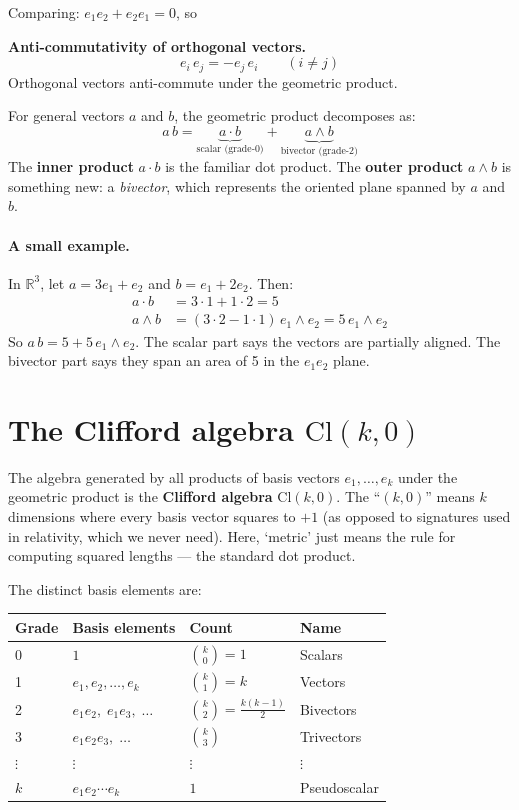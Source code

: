 \documentclass[11pt, twoside, openright]{memoir}
\newcommand{\ip}{\cdot}           %
\newcommand{\op}{\wedge}          %
\begin{document}
Comparing: $e_1 e_2 + e_2 e_1 = 0$, so

\begin{gabox}
\textbf{Anti-commutativity of orthogonal vectors.}
\[
  e_i \, e_j = -e_j \, e_i \qquad (i \neq j)
\]
Orthogonal vectors anti-commute under the geometric product.
\end{gabox}

For general vectors $a$ and $b$, the geometric product decomposes as:
\[
  a \, b = \underbrace{a \ip b}_{\text{scalar (grade-0)}}
         + \underbrace{a \op b}_{\text{bivector (grade-2)}}
\]
The \textbf{inner product} $a \ip b$ is the familiar dot product.
The \textbf{outer product} $a \op b$ is something new: a
\emph{bivector}, which represents the oriented plane spanned by $a$
and $b$.

\paragraph{A small example.}
In $\mathbb{R}^3$, let $a = 3e_1 + e_2$ and $b = e_1 + 2e_2$.  Then:
\begin{align*}
  a \ip b &= 3 \cdot 1 + 1 \cdot 2 = 5 \\
  a \op b &= (3 \cdot 2 - 1 \cdot 1)\, e_1 \op e_2
           = 5 \, e_1 \op e_2
\end{align*}
So $a\,b = 5 + 5\,e_1 \op e_2$.
The scalar part says the vectors are partially aligned.  The bivector
part says they span an area of 5 in the $e_1 e_2$ plane.

\section{The Clifford algebra $\mathrm{Cl}(k, 0)$}

The algebra generated by all products of basis vectors $e_1, \ldots, e_k$
under the geometric product is the \textbf{Clifford algebra}
$\mathrm{Cl}(k, 0)$.  The ``$(k, 0)$'' means $k$ dimensions where every basis vector squares to $+1$ (as opposed to signatures used in relativity, which we never need). Here, `metric' just means the rule for computing squared lengths --- the standard dot product.

The distinct basis elements are:
\begin{center}
\renewcommand{\arraystretch}{1.3}\small
\begin{tabular}{@{}l l l l@{}}
\toprule
\textbf{Grade} & \textbf{Basis elements} & \textbf{Count} & \textbf{Name} \\
\midrule
0 & $1$ & $\binom{k}{0} = 1$ & Scalars \\
1 & $e_1, e_2, \ldots, e_k$ & $\binom{k}{1} = k$ & Vectors \\
2 & $e_1 e_2, \; e_1 e_3, \; \ldots$ & $\binom{k}{2} = \frac{k(k-1)}{2}$ & Bivectors \\
3 & $e_1 e_2 e_3, \; \ldots$ & $\binom{k}{3}$ & Trivectors \\
$\vdots$ & $\vdots$ & $\vdots$ & $\vdots$ \\
$k$ & $e_1 e_2 \cdots e_k$ & $1$ & Pseudoscalar \\
\bottomrule
\end{tabular}
\end{center}
\end{document}
